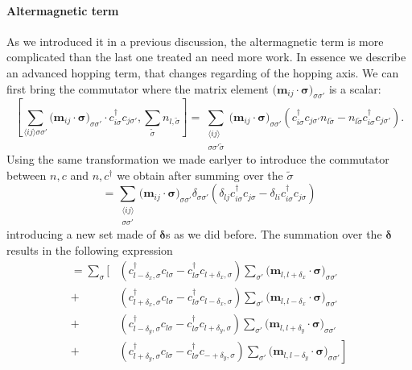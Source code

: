 \documentclass[../main.tex]{subfile}
\begin{document}
\paragraph{Altermagnetic term}
As we introduced it in a previous discussion, the altermagnetic term is more complicated than the last one treated an need more work. In essence we describe an 
advanced hopping term, that changes regarding of the hopping axis.
We can first bring the commutator where the matrix element $\bigl(\bm{m}_{ij}\cdot\bm{\sigma}\bigr)_{\sigma\sigma'} $ is a scalar:
\begin{equation*}
    \left[\sum_{\langle i j \rangle\sigma\sigma'}\bigl(\bm{m}_{ij}\cdot\bm{\sigma}\bigr)_{\sigma\sigma'} 
        \cdot c_{i\sigma}^{\dagger}c_{j\sigma'}, \sum_{\tilde{\sigma}} n_{l,\tilde{\sigma}}\right] 
    =\sum_{\substack{\langle i j \rangle \\\sigma\sigma'\tilde{\sigma}}} 
        \bigl(\bm{m}_{ij}\cdot\bm{\sigma}\bigr)_{\sigma\sigma'}  \left(c_{i\sigma}^{\dagger}c_{j\sigma'}n_{l\tilde{\sigma}} 
        -n_{l\tilde{\sigma}}c_{i\sigma}^{\dagger}c_{j\sigma'} \right).
\end{equation*}
Using the same transformation we made earlyer to introduce the commutator between $n,c$ and $n,c^{\dagger}$ we obtain after summing over the $\tilde{\sigma}$
\[
    = \sum_{\substack{\langle i j \rangle \\\sigma\sigma'}}  \bigl(\bm{m}_{ij}\cdot\bm{\sigma}\bigr)_{\sigma\sigma'}  
        \delta_{\sigma\sigma'} \left(\delta_{lj}c_{i\sigma}^{\dagger}c_{j\sigma} - \delta_{li}c_{i\sigma}^{\dagger}c_{j\sigma}\right)
\]
introducing a new set made of  $\bm{\delta}$s as we did before. The summation over the $\bm{\delta}$ results in the following  expression
\begin{equation*}
    \begin{aligned}
        = \sum_{\sigma}\Biggl[&
                \left(c_{l-\delta_x,\sigma}^{\dagger}c_{l\sigma} - c_{l\sigma}^{\dagger}c_{l+\delta_x,\sigma} \right) 
                    \sum_{\sigma'}\bigl(\bm{m}_{l,l+\delta_x}\cdot\bm{\sigma}\bigr)_{\sigma\sigma'}\\
                +&\left(c_{l+\delta_x,\sigma}^{\dagger}c_{l\sigma} - c_{l\sigma}^{\dagger}c_{l-\delta_x,\sigma} \right) 
                    \sum_{\sigma'}\bigl(\bm{m}_{l,l-\delta_x}\cdot\bm{\sigma}\bigr)_{\sigma\sigma'}\\
                +&\left(c_{l-\delta_y,\sigma}^{\dagger}c_{l\sigma} - c_{l\sigma}^{\dagger}c_{l+\delta_y,\sigma} \right) 
                    \sum_{\sigma'}\bigl(\bm{m}_{l,l+\delta_y}\cdot\bm{\sigma}\bigr)_{\sigma\sigma'}\\
                +&\left.\left(c_{l+\delta_y,\sigma}^{\dagger}c_{l\sigma} - c_{l\sigma}^{\dagger}c_{-+\delta_y,\sigma} \right) 
                    \sum_{\sigma'}\bigl(\bm{m}_{l,l-\delta_y}\cdot\bm{\sigma}\bigr)_{\sigma\sigma'}\right]
    \end{aligned}
\end{equation*} 
\end{document}
